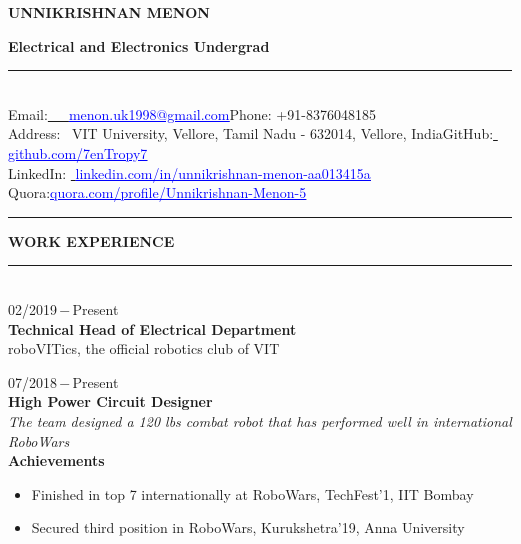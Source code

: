 \documentclass[a4paper, 12pt]{article}
\begin{document}
    \begin{center}
        \Huge{\textbf{UNNIKRISHNAN MENON}}
    \end{center}
    
    \begin{center}
        \textbf{Electrical and Electronics Undergrad}
    \end{center}
    
    \begin{flushleft}
    \noindent\rule{\textwidth}{1pt}\\
        Email:\href{menon.uk1998@gmail.com}{\textcolor{blue}{\,\,\,\,\,\,\, \underline{menon.uk1998@gmail.com}}}\qquad\qquad\qquad\qquad\qquad\qquad\qquad Phone: +91-8376048185\\
        \small{Address:\,\,\, VIT University, Vellore, Tamil Nadu - 632014, Vellore, India}\quad GitHub:\href{github.com/7enTropy7}{\textcolor{blue}{\,\,\underline{github.com/7enTropy7}}}\\LinkedIn: \href{linkedin.com/in/unnikrishnan-menon-aa013415a}{\textcolor{blue}{\,\,\underline{linkedin.com/in/unnikrishnan-menon-aa013415a}}}\\Quora:\href{quora.com/profile/Unnikrishnan-Menon-5}{\textcolor{blue}{\qquad\underline{quora.com/profile/Unnikrishnan-Menon-5}}}\\
        \noindent\rule{\textwidth}{1pt}
    \end{flushleft}
    
    \begin{flushleft}
        \textbf{WORK EXPERIENCE}\\\noindent\rule{\textwidth}{1pt}\\
        02/2019\,$-$\,Present\\
        \textbf{Technical Head of Electrical Department}\\
        roboVITics, the official robotics club of VIT
    \end{flushleft}
    
    \begin{flushleft}
        07/2018\,$-$\,Present\\
        \textbf{High Power Circuit Designer}\\
        \textit{The team designed a 120 lbs combat robot that has performed well in international RoboWars}\\\textbf{Achievements}\\\begin{itemize}
            \item Finished in top 7 internationally at RoboWars, TechFest'1, IIT Bombay\\
            \item Secured third position in RoboWars, Kurukshetra'19, Anna University
        \end{itemize}
    \end{flushleft}
    
\end{document}
